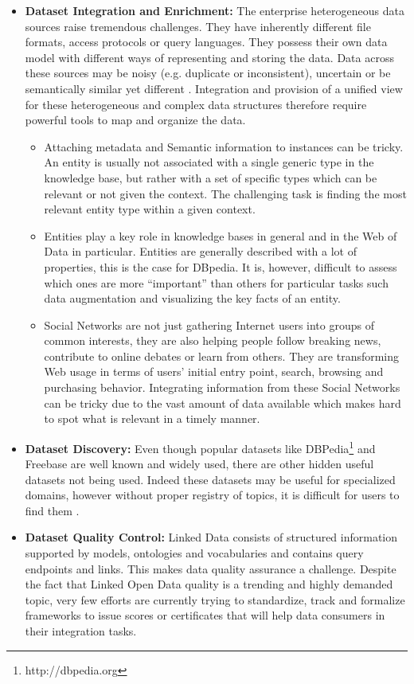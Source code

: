 \documentclass[onecolumn, crcready]{iosart2c}
\begin{document}
\begin{itemize}
\item {\bf Dataset Integration and Enrichment:} The enterprise heterogeneous data sources raise tremendous challenges. They have inherently different file formats, access protocols or query languages. They possess their own data model with different ways of representing and storing the data. Data across these sources may be noisy (e.g. duplicate or inconsistent), uncertain or be semantically similar yet different \cite{OntologyBasedSemantic}. Integration and provision of a unified view for these heterogeneous and complex data structures therefore require powerful tools to map and organize the data.
\begin{itemize}
	\item Attaching metadata and Semantic information to instances can be tricky. An entity is usually not associated with a single generic type in the knowledge base, but rather with a set of specific types which can be relevant or not given the context. The challenging task is finding the most relevant entity type within a given context.
	\item Entities play a key role in knowledge bases in general and in the Web of Data in particular. Entities are generally described with a lot of properties, this is the case for DBpedia. It is, however, difficult to assess which ones are more ``important'' than others for particular tasks such data augmentation and visualizing the key facts of an entity.
	\item Social Networks are not just gathering Internet users into groups of common interests, they are also helping people follow breaking news, contribute to online debates or learn from others. They are transforming Web usage in terms of users' initial entry point, search, browsing and purchasing behavior. Integrating information from these Social Networks can be tricky due to the vast amount of data available which makes hard to spot what is relevant in a timely manner.
\end{itemize}
\item {\bf Dataset Discovery:} Even though popular datasets like DBPedia\footnote{http://dbpedia.org} and Freebase are well known and widely used, there are other hidden useful datasets not being used. Indeed these datasets may be useful for specialized domains, however without proper registry of topics, it is difficult for users to find them \cite{AutomaticDomainIdentification}.
\item {\bf Dataset Quality Control:} Linked Data consists of structured information supported by models, ontologies and vocabularies and contains query endpoints and links. This makes data quality assurance a challenge. Despite the fact that Linked Open Data quality is a trending and highly demanded topic, very few efforts are currently trying to standardize, track and formalize frameworks to issue scores or certificates that will help data consumers in their integration tasks.

\end{itemize}
\end{document}
